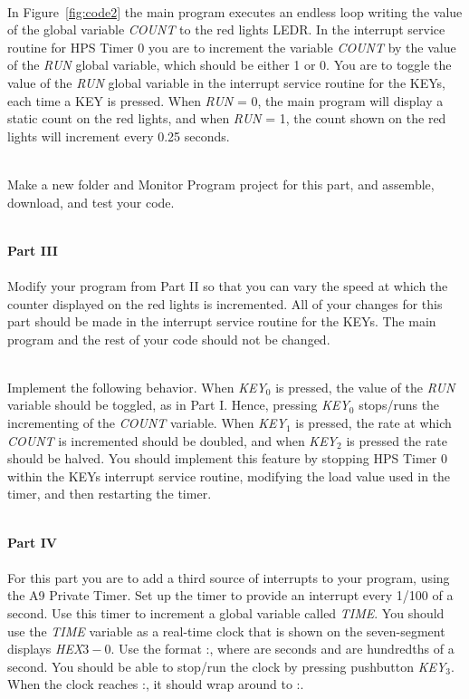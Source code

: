 \documentclass[epsfig,10pt,fullpage]{article}
\begin{document}
~\\
\noindent
In Figure~\ref{fig:code2} the main program executes an endless loop writing the value of
the global variable {\it COUNT} to the red lights LEDR.  In the interrupt service routine for 
HPS Timer 0 you are to increment the variable {\it COUNT} 
by the value of the {\it RUN} global variable, 
which should be either 1 or 0.  You are to toggle the value of the {\it RUN} global variable 
in the interrupt service routine for the KEYs, each time a KEY is pressed.
When {\it RUN} = 0, the main program will display a static count on the red lights,
and when {\it RUN} = 1, the count shown on the red lights will increment every 0.25 seconds.

~\\
\noindent
Make a new folder and Monitor Program project for this part, and assemble, download, and 
test your code.

~\\
\noindent
{\bf Part III}
~\\
~\\
\noindent
Modify your program from Part II so that you can vary the speed at which the counter
displayed on the red lights is incremented. All of your changes for this part should be made
in the interrupt service routine for the KEYs. The main program and the rest of
your code should not be changed.

~\\
\noindent
Implement the following behavior. When {\it KEY}$_0$ is pressed, the value of the {\it RUN}
variable should be toggled, as in Part I. Hence, pressing {\it KEY}$_0$ stops/runs
the incrementing of the {\it COUNT} variable. When {\it KEY}$_1$ is pressed, the rate at which
{\it COUNT} is incremented should be doubled, and when {\it KEY}$_2$ is pressed the
rate should be halved. You should implement this feature by stopping HPS Timer 0 within
the KEYs interrupt service routine, modifying the load value used in the
timer, and then restarting the timer.

~\\
\noindent
\noindent
{\bf Part IV}
~\\
~\\
\noindent
For this part you are to add a third source of interrupts to your program, using the A9
Private Timer. Set up the timer to provide an interrupt every 1/100 of a second. Use this
timer to increment a global variable called {\it TIME}. You should use the {\it TIME} variable as
a real-time clock that is shown on the seven-segment displays {\it HEX}$3-0$. Use the format 
:, where  are seconds and  are hundredths of a second.
You should be able to stop/run the clock by pressing pushbutton {\it KEY}$_3$.
When the clock reaches :, it should wrap around to :.
\end{document}
